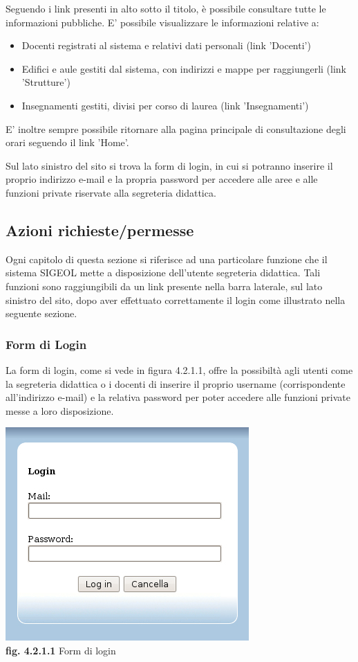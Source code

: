 \documentclass[11pt,a4paper]{article}
\begin{document}
Seguendo i link presenti in alto sotto il titolo, è possibile consultare tutte le informazioni pubbliche. E' possibile visualizzare le informazioni relative a:
\begin{itemize}
 \item Docenti registrati al sistema e relativi dati personali (link 'Docenti')
 \item Edifici e aule gestiti dal sistema, con indirizzi e mappe per raggiungerli (link 'Strutture')
 \item Insegnamenti gestiti, divisi per corso di laurea (link 'Insegnamenti')
\end{itemize}

E' inoltre sempre possibile ritornare alla pagina principale di consultazione degli orari seguendo il link 'Home'.

Sul lato sinistro del sito si trova la form di login, in cui si potranno inserire il proprio indirizzo e-mail e la propria password per accedere alle aree e alle funzioni private riservate alla segreteria didattica.
\subsection{Azioni richieste/permesse}
Ogni capitolo di questa sezione si riferisce ad una particolare funzione che il sistema SIGEOL mette a disposizione dell'utente segreteria didattica. Tali funzioni sono raggiungibili da un link presente nella barra laterale, sul lato sinistro del sito, dopo aver effettuato correttamente il login come illustrato nella seguente sezione.
\subsubsection{Form di Login}
La form di login, come si vede in figura 4.2.1.1, offre la possibiltà agli utenti come la segreteria didattica o i docenti di inserire il proprio username (corrispondente all'indirizzo e-mail) e la relativa password per poter accedere alle funzioni private messe a loro disposizione.

\bigskip
\begin{center}
	\includegraphics[scale=0.5]{images/login.jpg}\\
	\textbf{fig. 4.2.1.1} Form di login\\
\end{center}
\bigskip
\end{document}
